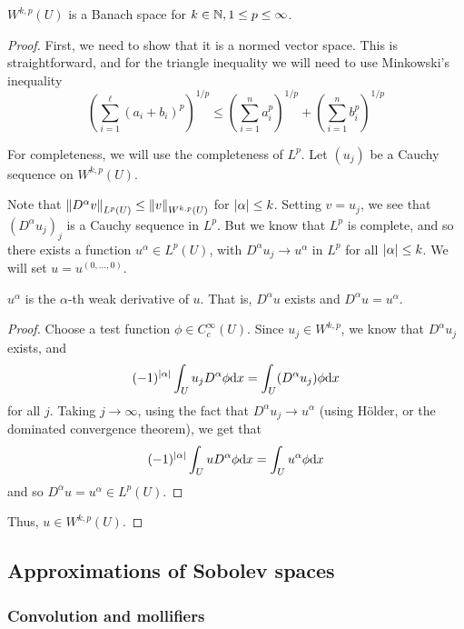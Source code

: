 \documentclass{article}
\begin{document}
\begin{theorem}
    \(W^{k, p}(U)\) is a Banach space for \(k \in \mathbb{N}, 1 \le p \le \infty\).
\end{theorem}

\begin{proof}
    First, we need to show that it is a normed vector space. This is straightforward, and for the triangle inequality we will need to use Minkowski's inequality
    \[\left(\sum_{i=1}^\ell (a_i + b_i)^p\right)^{1/p} \le \left(\sum_{i=1}^n a_i^p\right)^{1/p} + \left(\sum_{i=1}^n b_i^p\right)^{1/p}\]

    For completeness, we will use the completeness of \(L^p\). Let \((u_j)\) be a Cauchy sequence on \(W^{k, p}(U)\).

    Note that \(\norm{D^\alpha v}_{L^p(U)} \le \norm{v}_{W^{k, p}(U)}\) for \(\abs{\alpha} \le k\). Setting \(v = u_j\), we see that \((D^\alpha u_j)_j\) is a Cauchy sequence in \(L^p\). But we know that \(L^p\) is complete, and so there exists a function \(u^\alpha \in L^p(U)\), with \(D^\alpha u_j \to u^\alpha\) in \(L^p\) for all \(\abs{\alpha}\le k\). We will set \(u = u^{(0, \dots, 0)}\).

    \begin{claim}
        \(u^\alpha\) is the \(\alpha\)-th weak derivative of \(u\). That is, \(D^\alpha u\) exists and \(D^\alpha u = u^\alpha\).
    \end{claim}

    \begin{proof}
        Choose a test function \(\phi \in C_c^\infty(U)\). Since \(u_j \in W^{k, p}\), we know that \(D^\alpha u_j\) exists, and
        \[(-1)^{\abs{\alpha}}\int_U u_j D^\alpha \phi \dd x = \int_U(D^\alpha u_j)\phi \dd x\]
        for all \(j\). Taking \(j \to \infty\), using the fact that \(D^\alpha u_j \to u^\alpha\) (using H\"older, or the dominated convergence theorem), we get that
        \[(-1)^{\abs{\alpha}}\int_U uD^\alpha \phi \dd x = \int_U u^\alpha \phi \dd x\]
        and so \(D^\alpha u = u^\alpha \in L^p(U)\).
    \end{proof}

    Thus, \(u \in W^{k,p}(U)\).
\end{proof}

\subsection{Approximations of Sobolev spaces}

\subsubsection*{Convolution and mollifiers}
\end{document}
